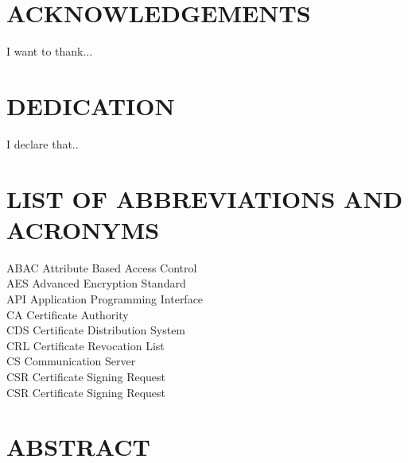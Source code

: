 \documentclass[12pt]{report}    %
\begin{document}
\chapter*{\centering \MakeUppercase{Acknowledgements}}
I want to thank...



\chapter*{\centering \MakeUppercase{Dedication}}

I declare that..



\chapter*{\centering \MakeUppercase{List Of Abbreviations And Acronyms}}
ABAC \hspace{2.1cm}Attribute Based Access Control \\
AES  \hspace{2.5cm}Advanced Encryption Standard \\
API  \hspace{2.5cm}Application Programming Interface \\
CA   \hspace{2.6cm}Certificate Authority \\
CDS  \hspace{2.45cm}Certificate Distribution System \\
CRL  \hspace{2.45cm}Certificate Revocation List \\
CS   \hspace{2.7cm}Communication Server \\
CSR  \hspace{2.5cm}Certificate Signing Request \\
CSR  \hspace{2.5cm}Certificate Signing Request



\chapter*{\centering \MakeUppercase{Abstract}}   
\end{document}
